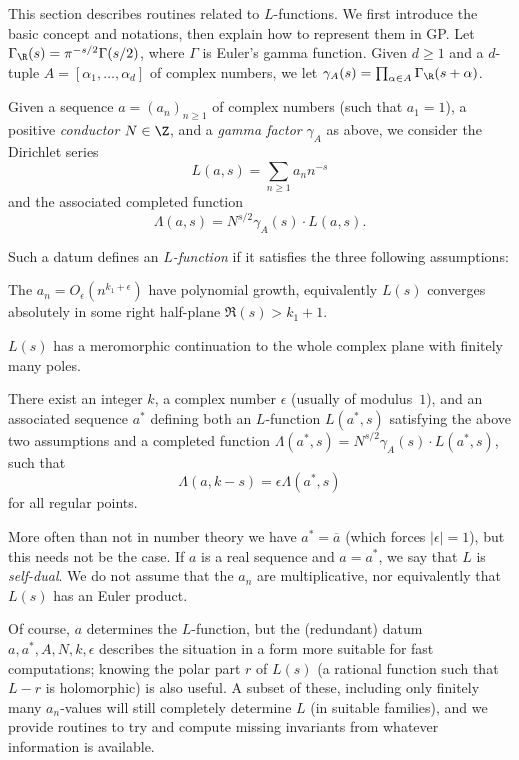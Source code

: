 This section describes routines related to $L$-functions. We first introduce
the basic concept and notations, then explain how to represent them in GP.
Let $\Gamma_\R(s) = \pi^{-s/2}\Gamma(s/2)$, where $\Gamma$ is Euler's gamma
function. Given $d \geq 1$ and a $d$-tuple $A=[\alpha_1,\dots,\alpha_d]$ of
complex numbers, we let $\gamma_A(s) = \prod_{\alpha \in A} \Gamma_\R(s +
\alpha)$.

Given a sequence $a = (a_n)_{n\geq 1}$ of complex numbers (such that $a_1 = 1$),
a positive \emph{conductor} $N \in \Z$, and a \emph{gamma factor}
$\gamma_A$ as above, we consider the Dirichlet series
$$ L(a,s) = \sum_{n\geq 1} a_n n^{-s} $$
and the associated completed function
$$ \Lambda(a,s) = N^{s/2}\gamma_A(s) \cdot L(a,s). $$

Such a datum defines an \emph{$L$-function} if it satisfies the three
following assumptions:

\item [Convergence] The $a_n = O_\epsilon(n^{k_1+\epsilon})$ have polynomial
growth, equivalently $L(s)$ converges absolutely in some right half-plane
$\Re(s) > k_1 + 1$.

\item [Analytic continuation] $L(s)$ has a meromorphic continuation to the
whole complex plane with finitely many poles.

\item [Functional equation] There exist an integer $k$, a complex number
$\epsilon$ (usually of modulus~$1$), and an associated sequence $a^*$
defining both an $L$-function $L(a^*,s)$ satisfying the above two assumptions
and a completed function $\Lambda(a^*,s) = N^{s/2}\gamma_A(s) \cdot
L(a^*,s)$, such that
$$\Lambda(a,k-s) = \epsilon \Lambda(a^*,s)$$
for all regular points.

More often than not in number theory we have $a^* = \overline{a}$ (which
forces $|\epsilon| = 1$), but this needs not be the case. If $a$ is a real
sequence and $a = a^*$, we say that $L$ is \emph{self-dual}. We do not assume
that the $a_n$ are multiplicative, nor equivalently that $L(s)$ has an Euler
product.

Of course, $a$ determines the $L$-function, but the (redundant) datum $a,a^*,
A, N, k, \epsilon$ describes the situation in a form more suitable for fast
computations; knowing the polar part $r$ of $L(s)$ (a rational function such
that $L-r$ is holomorphic) is also useful. A subset of these, including only
finitely many $a_n$-values will still completely determine $L$ (in suitable
families), and we provide routines to try and compute missing invariants from
whatever information is available.

